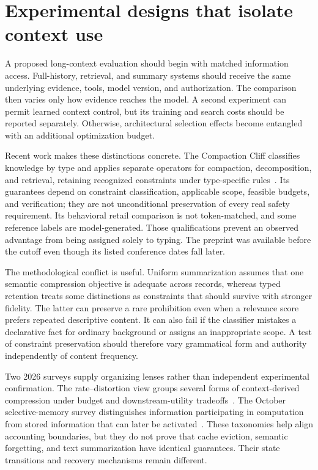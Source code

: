 \section{Experimental designs that isolate context use}\label{sec:C11:experiments}
A proposed long-context evaluation should begin with matched information access. Full-history, retrieval, and summary systems should receive the same underlying evidence, tools, model version, and authorization. The comparison then varies only how evidence reaches the model. A second experiment can permit learned context control, but its training and search costs should be reported separately. Otherwise, architectural selection effects become entangled with an additional optimization budget.

Recent work makes these distinctions concrete. The Compaction Cliff classifies knowledge by type and applies separate operators for compaction, decomposition, and retrieval, retaining recognized constraints under type-specific rules~\cite{zerhoudi2026cliff}. Its guarantees depend on constraint classification, applicable scope, feasible budgets, and verification; they are not unconditional preservation of every real safety requirement. Its behavioral retail comparison is not token-matched, and some reference labels are model-generated. Those qualifications prevent an observed advantage from being assigned solely to typing. The preprint was available before the cutoff even though its listed conference dates fall later.

The methodological conflict is useful. Uniform summarization assumes that one semantic compression objective is adequate across records, whereas typed retention treats some distinctions as constraints that should survive with stronger fidelity. The latter can preserve a rare prohibition even when a relevance score prefers repeated descriptive content. It can also fail if the classifier mistakes a declarative fact for ordinary background or assigns an inappropriate scope. A test of constraint preservation should therefore vary grammatical form and authority independently of content frequency.

Two 2026 surveys supply organizing lenses rather than independent experimental confirmation. The rate--distortion view groups several forms of context-derived compression under budget and downstream-utility tradeoffs~\cite{colaco2026ratedistortion}. The October selective-memory survey distinguishes information participating in computation from stored information that can later be activated~\cite{gou2026selective}. These taxonomies help align accounting boundaries, but they do not prove that cache eviction, semantic forgetting, and text summarization have identical guarantees. Their state transitions and recovery mechanisms remain different.

